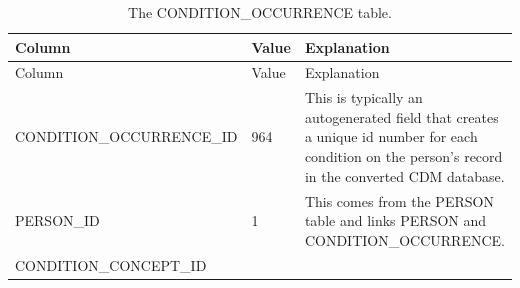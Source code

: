 \documentclass[]{book}
\begin{document}
\begin{longtable}[]{@{}lll@{}}
\caption{\label{tab:conditionOccurrence} The CONDITION\_OCCURRENCE
table.}\tabularnewline
\toprule
\begin{minipage}[b]{0.27\columnwidth}\raggedright\strut
Column\strut
\end{minipage} & \begin{minipage}[b]{0.14\columnwidth}\raggedright\strut
Value\strut
\end{minipage} & \begin{minipage}[b]{0.50\columnwidth}\raggedright\strut
Explanation\strut
\end{minipage}\tabularnewline
\midrule
\endfirsthead
\toprule
\begin{minipage}[b]{0.27\columnwidth}\raggedright\strut
Column\strut
\end{minipage} & \begin{minipage}[b]{0.14\columnwidth}\raggedright\strut
Value\strut
\end{minipage} & \begin{minipage}[b]{0.50\columnwidth}\raggedright\strut
Explanation\strut
\end{minipage}\tabularnewline
\midrule
\endhead
\begin{minipage}[t]{0.27\columnwidth}\raggedright\strut
CONDITION\_OCCURRENCE\_ID\strut
\end{minipage} & \begin{minipage}[t]{0.14\columnwidth}\raggedright\strut
964\strut
\end{minipage} & \begin{minipage}[t]{0.50\columnwidth}\raggedright\strut
This is typically an autogenerated field that creates a unique id number
for each condition on the person's record in the converted CDM
database.\strut
\end{minipage}\tabularnewline
\begin{minipage}[t]{0.27\columnwidth}\raggedright\strut
PERSON\_ID\strut
\end{minipage} & \begin{minipage}[t]{0.14\columnwidth}\raggedright\strut
1\strut
\end{minipage} & \begin{minipage}[t]{0.50\columnwidth}\raggedright\strut
This comes from the PERSON table and links PERSON and
CONDITION\_OCCURRENCE.\strut
\end{minipage}\tabularnewline
\begin{minipage}[t]{0.27\columnwidth}\raggedright\strut
CONDITION\_CONCEPT\_ID\strut

\end{minipage}
\end{longtable}
\end{document}
